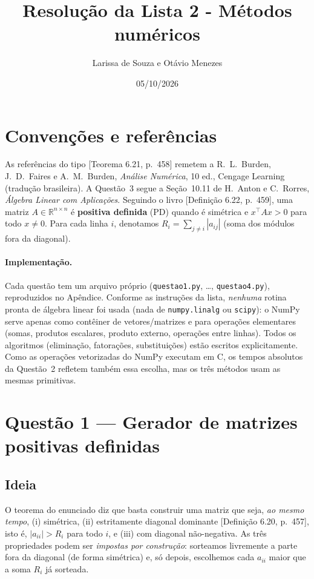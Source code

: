 \documentclass{article}
\newcommand{\R}{\mathbb{R}}
\newcommand{\T}{^{\top}}
\newcommand{\burden}[1]{\textsf{\footnotesize[#1]}}
\theoremstyle{remark}
\begin{document}
\title{Resolução da Lista 2 - Métodos numéricos}
\author{Larissa de Souza e Otávio Menezes}
\date{05/10/2026}
\maketitle

\section*{Convenções e referências}
As referências do tipo \burden{Teorema 6.21, p.~458} remetem a R.~L.~Burden, J.~D.~Faires e A.~M.~Burden,
\emph{Análise Numérica}, 10\textordfeminine{} ed., Cengage Learning (tradução brasileira). A Questão~3 segue a Seção~10.11
de H.~Anton e C.~Rorres, \emph{Álgebra Linear com Aplicações}. Seguindo o livro \burden{Definição 6.22, p.~459}, uma matriz
$A\in\R^{n\times n}$ é \textbf{positiva definida} (PD) quando é simétrica e $x\T Ax>0$ para todo $x\neq0$. Para cada linha $i$,
denotamos $R_i=\sum_{j\ne i}|a_{ij}|$ (soma dos módulos fora da diagonal).

\paragraph{Implementação.} Cada questão tem um arquivo próprio (\texttt{questao1.py}, \dots, \texttt{questao4.py}),
reproduzidos no Apêndice. Conforme as instruções da lista, \emph{nenhuma} rotina pronta de álgebra linear foi usada
(nada de \texttt{numpy.linalg} ou \texttt{scipy}): o NumPy serve apenas como contêiner de vetores/matrizes e para
operações elementares (somas, produtos escalares, produto externo, operações entre linhas). Todos os algoritmos
(eliminação, fatorações, substituições) estão escritos explicitamente. Como as operações vetorizadas do NumPy executam em C,
os tempos absolutos da Questão~2 refletem também essa escolha, mas os três métodos usam as mesmas primitivas.

\section{Questão 1 --- Gerador de matrizes positivas definidas}

\subsection{Ideia}
O teorema do enunciado diz que basta construir uma matriz que seja, \emph{ao mesmo tempo},
(i) simétrica, (ii) estritamente diagonal dominante \burden{Definição 6.20, p.~457}, isto é,
$|a_{ii}|>R_i$ para todo $i$, e (iii) com diagonal não-negativa. As três propriedades podem ser
\emph{impostas por construção}: sorteamos livremente a parte fora da diagonal (de forma simétrica) e, só depois,
escolhemos cada $a_{ii}$ maior que a soma $R_i$ já sorteada.
\end{document}
